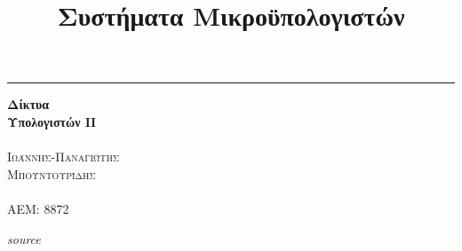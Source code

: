 \documentclass{article}
\date{\vspace{-4ex}}
\title{Συστήματα Μικροϋπολογιστών}
\begin{document}
\begin{titlepage} %
	
	\raggedleft %
	
	\rule{1pt}{\textheight} %
	\hspace{0.05\textwidth} %
	\parbox[b]{0.75\textwidth}{ %
		
		{\Huge\bfseries Δίκτυα \\[0.5\baselineskip] Υπολογιστών ΙI}\\[2\baselineskip] %
		{\large\textit{ }}\\[4\baselineskip] %
		{\Large\textsc{Ιωάννης-Παναγιώτης \\Μπουντουρίδης}} %
	\\	\\{\large\textsc{ΑΕΜ: 8872}} %
		
		\vspace{0.5\textheight} %
		
		{\noindent \textit{source}}\\[\baselineskip] %
	}

\end{titlepage}

\newpage
\tiny{}
\end{document}
